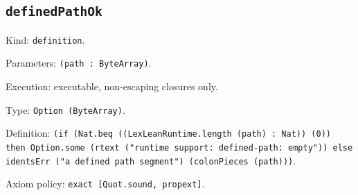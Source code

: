 \documentclass[11pt]{article}
\begin{document}
\subsection*{\texttt{definedPathOk}}
\noindent Kind: \texttt{definition}.\par
\noindent Parameters: \texttt{(path : ByteArray)}.\par
\noindent Execution: executable, non-escaping closures only.\par
\noindent Type: \texttt{Option (ByteArray)}.\par
\noindent Definition: \texttt{(if (Nat.beq ((LexLeanRuntime.length (path) : Nat)) (0)) then Option.some (rtext ("runtime support: defined-path: empty")) else identsErr ("a defined path segment") (colonPieces (path)))}.\par
\noindent Axiom policy: \texttt{exact [Quot.sound, propext]}.\par
\end{document}
